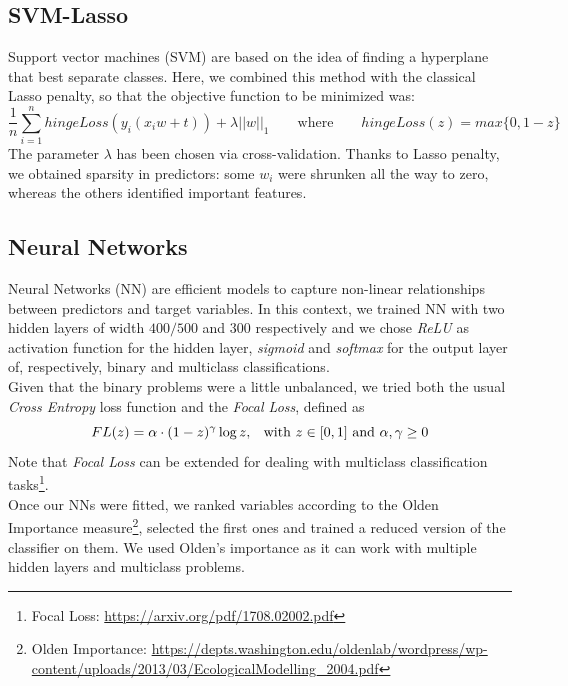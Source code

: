 \documentclass[a4paper,11pt, oneside]{article}  %
\begin{document}
\subsection{SVM-Lasso}
Support vector machines (SVM) are based on the idea of finding a hyperplane that best separate classes. Here, we combined this method with the classical Lasso penalty, so that the objective function to be minimized was:
\begin{equation*}
\dfrac{1}{n} \sum_{i=1}^n hingeLoss(y_i(x_i w + t)) + \lambda ||w||_1  \qquad	\text{where} \qquad  hingeLoss(z) = max\{0, 1-z\}
\end{equation*}
The parameter $\lambda$ has been chosen via cross-validation. Thanks to Lasso penalty, we obtained sparsity in predictors: some $w_i$ were shrunken all the way to zero, whereas the others identified important features. 

\subsection{Neural Networks}
Neural Networks (NN) are efficient models to capture non-linear relationships between predictors and target variables. In this context, we trained NN with two hidden layers of width $400/500$ and $300$ respectively and we chose \textit{ReLU} as activation function for the hidden layer, \textit{sigmoid} and \textit{softmax} for the output layer of, respectively, binary and multiclass classifications. \\
Given that the binary problems were a little unbalanced, we tried both the usual \textit{Cross Entropy} loss function and the \textit{Focal Loss}, defined as 
\begin{equation*}
FL(z) = \alpha \cdot (1 - z)^{\gamma} \log{z} \text{,  \hspace{3pt} with }z \in [0,1]  \text{ and } \alpha,  \gamma \geq 0
\end{equation*}
Note that \textit{Focal Loss} can be extended for dealing with multiclass classification tasks\footnote{Focal Loss: \url{https://arxiv.org/pdf/1708.02002.pdf}}. \\
Once our NNs were fitted,  we ranked variables according to the Olden Importance measure\footnote{Olden Importance: \url{https://depts.washington.edu/oldenlab/wordpress/wp-content/uploads/2013/03/EcologicalModelling_2004.pdf}}, selected the first ones and trained a reduced version of the classifier on them. We used Olden's importance as it can work with multiple hidden layers and multiclass problems. 
\end{document}
